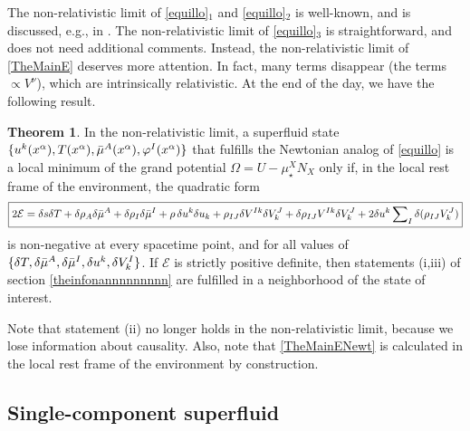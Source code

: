 \documentclass[a4paper, amsfonts, amssymb, amsmath, reprint, showkeys, nofootinbib, twoside,notitlepage,onecolumn]{revtex4-2}
\theoremstyle{definition}
\theoremstyle{theorem}
\newtheorem{theorem}{Theorem}
\theoremstyle{corollary}
\begin{document}
The non-relativistic limit of \eqref{equillo}$_1$ and \eqref{equillo}$_2$ is well-known, and is discussed, e.g., in \citet[\S 27]{landau5}.
The non-relativistic limit of \eqref{equillo}$_3$ is straightforward, and does not need additional comments. Instead, the non-relativistic limit of \eqref{TheMainE} deserves more attention. In fact, many terms disappear (the terms $\propto V^\nu$), which are intrinsically relativistic. At the end of the day, we have the following result.{\color{black}
\begin{theorem}\label{Theo2} In the non-relativistic limit, a superfluid state $\{u^k (x^\alpha),T(x^\alpha),\Bar{\mu}^A(x^\alpha),\varphi^I(x^\alpha)\}$ that fulfills the Newtonian analog of \eqref{equillo} is a local minimum of the grand potential $\Omega=U-\mu^X_\star N_X$ only if, in the local rest frame of the environment, the quadratic form 
\begin{equation}\label{TheMainENewt}
\boxed{2\mathcal{E}= \delta s \delta T+ \delta \rho_A \delta \Bar{\mu}^A +\delta \rho_I \delta \Bar{\mu}^I+ \rho\,\delta u^k \delta u_k +\rho_{IJ} \delta V^{Ik}\delta V^J_k  +\delta \rho_{IJ} V^{Ik}\delta V^J_k +2 \delta u^k \sum\nolimits_I  \delta ( \rho_{IJ} V^J_k)  }
\end{equation}
is non-negative at every spacetime point, and for all values of $\{\delta T,\delta \Bar{\mu}^A,\delta \Bar{\mu}^I,\delta u^k,\delta V^I_k \}$. If $\mathcal{E}$ is strictly positive definite, then statements \textup{(i,iii)} of section \ref{theinfonannnnnnnnn} are fulfilled in a neighborhood of the state of interest.
\end{theorem}}
Note that statement (ii) no longer holds in the non-relativistic limit, because we lose information about causality. Also, note that \eqref{TheMainENewt} is calculated in the local rest frame of the environment by construction. 

\vspace{-0.3cm}
\subsection{Single-component superfluid}
\vspace{-0.2cm}
\end{document}
